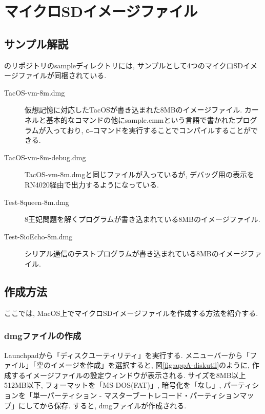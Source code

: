 \chapter{マイクロSDイメージファイル}
\label{appA}

\section{サンプル解説}
\tacsim のリポジトリのsampleディレクトリには, サンプルとして4つのマイクロSDイメージファイルが同梱されている. 

\begin{description}
    \item[TacOS-vm-8m.dmg] 仮想記憶に対応したTacOSが書き込まれた8MBのイメージファイル. カーネルと基本的なコマンドの他にsample.cmmという\cmm 言語で書かれたプログラムが入っており, {\tt c--}コマンドを実行することでコンパイルすることができる.
    \item[TacOS-vm-8m-debug.dmg] TacOS-vm-8m.dmgと同じファイルが入っているが, デバッグ用の表示をRN4020経由で出力するようになっている.
    \item[Test-8queen-8m.dmg] 8王妃問題を解くプログラムが書き込まれている8MBのイメージファイル.
    \item[Test-SioEcho-8m.dmg] シリアル通信のテストプログラムが書き込まれている8MBのイメージファイル.
\end{description}

\section{作成方法}

ここでは, MacOS上でマイクロSDイメージファイルを作成する方法を紹介する. 

\subsection{dmgファイルの作成}

Launchpadから「ディスクユーティリティ」を実行する. メニューバーから「ファイル」\rightarrow「空のイメージを作成」を選択すると, 図\ref{fig:appA-diskutil}のように, 作成するイメージファイルの設定ウィンドウが表示される.
サイズを8MB以上512MB以下, フォーマットを「MS-DOS(FAT)」, 暗号化を「なし」, パーティションを「単一パーティション - マスターブートレコード・パーティションマップ」にしてから保存. すると, dmgファイルが作成される.


